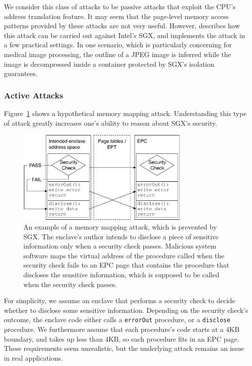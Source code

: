 We consider this class of attacks to be passive attacks that exploit the CPU's
address translation feature. It may seem that the page-level memory access
patterns provided by these attacks are not very useful. However,
\cite{xu2015pagefaults} describes how this attack can be carried out against
Intel's SGX, and implements the attack in a few practical settings. In one
scenario, which is particularly concerning for medical image processing,
the outline of a JPEG image is inferred while the image is decompressed inside
a container protected by SGX's isolation guarantees.


\subsubsection{Active Attacks}
\label{sec:memory_mapping_attacks}

Figure~\ref{fig:sgx_mapping_attack} shows a hypothetical memory mapping attack.
Understanding this type of attack
greatly increases one's ability to reason about SGX's security.

\begin{figure}[hbt]
  \centering
  \includegraphics[width=85mm]{figures/sgx_mapping_attack.pdf}
  \caption{
    An example of a memory mapping attack, which is prevented by SGX. The
    enclave's author intends to disclose a piece of sensitive information only
    when a security check passes. Malicious system software maps the virtual
    address of the procedure called when the security check fails to an EPC
    page that contains the procedure that discloses the sensitive information,
    which is supposed to be called when the security check passes.
  }
  \label{fig:sgx_mapping_attack}
\end{figure}

For simplicity, we assume an enclave that performs a security check to decide
whether to disclose some sensitive information. Depending on the security
check's outcome, the enclave code either calls a \texttt{errorOut} procedure,
or a \texttt{disclose} procedure. We furthermore assume that each procedure's
code starts at a 4KB boundary, and takes up less than 4KB, so each procedure
fits in an EPC page. These requirements seem unrealistic, but the underlying
attack remains an issue in real applications.

